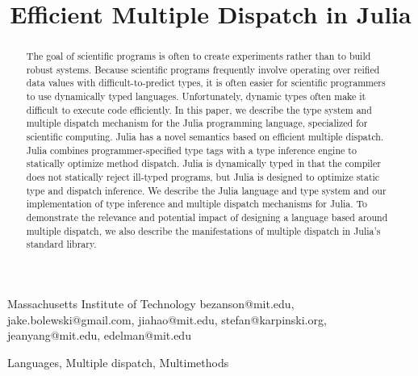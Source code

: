 \documentclass[pldi]{sigplanconf-pldi15}
\begin{document}
\lstset{basicstyle=\footnotesize\ttfamily,mathescape=true,basewidth=0.5em}



\title{Efficient Multiple Dispatch in Julia}

	{Massachusetts Institute of Technology}
	{bezanson@mit.edu, jake.bolewski@gmail.com, jiahao@mit.edu, stefan@karpinski.org, jeanyang@mit.edu, edelman@mit.edu}

\maketitle

\begin{abstract}
The goal of scientific programs is often to create experiments rather than to
build robust systems. Because scientific programs frequently involve operating
over reified data values with difficult-to-predict types, it is often easier
for scientific programmers to use dynamically typed languages. Unfortunately,
dynamic types often make it difficult to execute code efficiently. In this
paper, we describe the type system and multiple dispatch mechanism for the
Julia programming language, specialized for scientific computing. Julia has a
novel semantics based on efficient multiple dispatch. Julia combines
programmer-specified type tags with a type inference engine to statically
optimize method dispatch. Julia is dynamically typed in that the compiler does
not statically reject ill-typed programs, but Julia is designed to optimize
static type and dispatch inference. We describe the Julia language and type
system and our implementation of type inference and multiple dispatch
mechanisms for Julia. To demonstrate the relevance and potential impact of
designing a language based around multiple dispatch, we also describe the
manifestations of multiple dispatch in Julia's standard library.
\end{abstract}


\terms Languages, Multiple dispatch, Multimethods
\end{document}

